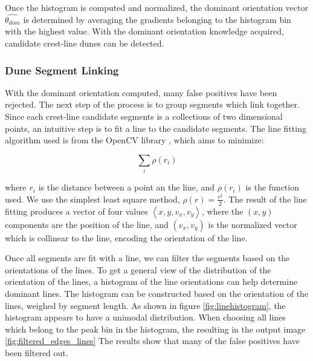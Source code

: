   Once the histogram is computed and normalized, the dominant orientation vector $\hat{\theta_{dom}}$ is determined by averaging the gradients belonging to the histogram bin with the highest value. With the dominant orientation knowledge acquired, candidate crest-line dunes can be detected.
  
  \subsubsection{Dune Segment Linking}
  
  With the dominant orientation computed, many false positives have been rejected. The next step of the process is to group segments which link together. Since each crest-line candidate segments is a collections of two dimensional points, an intuitive step is to fit a line to the candidate segments. The line fitting algorithm used is from the OpenCV library \cite{opencv_library}, which aims to minimize:
  
  \begin{equation}
  \sum_{i}\rho\left(r_{i}\right)
  \end{equation}
  
  where $r_{i}$ is the distance between a point an the line, and $\rho\left(r_{i}\right)$ is the function used. We use the simplest least square method, $\rho\left(r\right)=\frac{r^{2}}{2}$. The result of the line fitting produces a vector of four values $\left\langle x,y,v_{x},v_{y}\right\rangle$, where the $(x, y)$ components are the position of the line, and $(v_{x},v_{y})$ is the normalized vector which is collinear to the line, encoding the orientation of the line.
  
  Once all segments are fit with a line, we can filter the segments based on the orientations of the lines. To get a general view of the distribution of the orientation of the lines, a histogram of the line orientations can help determine dominant lines. The histogram can be constructed based on the orientation of the lines, weighed by segment length. As shown in figure \ref{fig:linehistogram}, the histogram appears to have a unimodal distribution. When choosing all lines which belong to the peak bin in the histogram, the resulting in the output image \ref{fig:filtered_edges_lines} The results show that many of the false positives have been filtered out.
  
